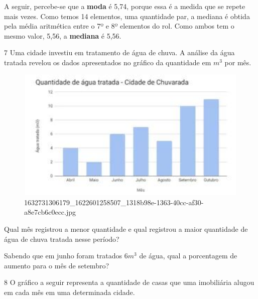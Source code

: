 {{{\begin{escolha}
{{{{\begin{escolha}
\begin{escolha}
{{A seguir, percebe-se que a \textbf{moda} é 5,74, porque essa é a medida que se
repete mais vezes. Como temos 14 elementos, uma quantidade par, a mediana é obtida
pela média aritmética entre o 7º e 8º elementos do rol. Como ambos tem o mesmo valor, 
5,56, a \textbf{mediana} é 5,56.}

\num{7} Uma cidade investiu em tratamento de água de chuva. A análise da água
tratada revelou os dados apresentados no gráfico da quantidade em $m^3$ por
mês.

\begin{figure}
\centering
\includegraphics[width=4.95586in,height=2.50694in]{./_SAEB_9_MAT/media/image216.jpg}
\caption{1632731306179\_1622601258507\_1318b98e-1363-40cc-af30-a8e7cb6c0ecc.jpg}
\end{figure}


\begin{escolha}

  \item Qual mês registrou a menor quantidade e qual registrou a maior
  quantidade de água de chuva tratada nesse período?



  \item Sabendo que em junho foram tratados $6m^3$ de água, qual a porcentagem
  de aumento para o mês de setembro?



\end{escolha}

\num{8} O gráfico a seguir representa a quantidade de casas que uma
imobiliária alugou em cada mês em uma determinada cidade.

}
\end{escolha}
\end{escolha}}}}}
\end{escolha}}}}
